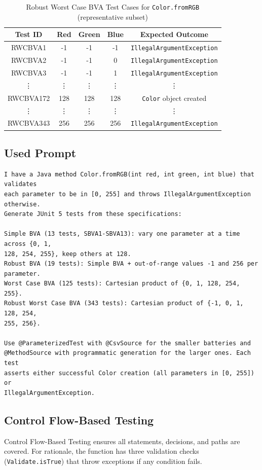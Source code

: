 \documentclass[11pt, a4paper]{article}
\begin{document}
\begin{table}[H]
\centering
\caption{Robust Worst Case BVA Test Cases for \texttt{Color.fromRGB} (representative subset)}
\label{tab:color_robust_worst_case_bva}
\begin{tabular}{ccccc}
\toprule
\textbf{Test ID} & \textbf{Red} & \textbf{Green} & \textbf{Blue} & \textbf{Expected Outcome} \\
\midrule
RWCBVA1   & -1  & -1  & -1  & \texttt{IllegalArgumentException} \\
RWCBVA2   & -1  & -1  & 0   & \texttt{IllegalArgumentException} \\
RWCBVA3   & -1  & -1  & 1   & \texttt{IllegalArgumentException} \\
\vdots    & \vdots & \vdots & \vdots & \vdots \\
RWCBVA172 & 128 & 128 & 128 & \texttt{Color} object created \\
\vdots    & \vdots & \vdots & \vdots & \vdots \\
RWCBVA343 & 256 & 256 & 256 & \texttt{IllegalArgumentException} \\
\bottomrule
\end{tabular}
\end{table}

\subsection{Used Prompt}
\begin{lstlisting}
I have a Java method Color.fromRGB(int red, int green, int blue) that validates
each parameter to be in [0, 255] and throws IllegalArgumentException otherwise.
Generate JUnit 5 tests from these specifications:

Simple BVA (13 tests, SBVA1-SBVA13): vary one parameter at a time across {0, 1,
128, 254, 255}, keep others at 128. 
Robust BVA (19 tests): Simple BVA + out-of-range values -1 and 256 per
parameter. 
Worst Case BVA (125 tests): Cartesian product of {0, 1, 128, 254, 255}. 
Robust Worst Case BVA (343 tests): Cartesian product of {-1, 0, 1, 128, 254,
255, 256}.

Use @ParameterizedTest with @CsvSource for the smaller batteries and
@MethodSource with programmatic generation for the larger ones. Each test
asserts either successful Color creation (all parameters in [0, 255]) or
IllegalArgumentException.
\end{lstlisting}

\subsection{Control Flow-Based Testing}
Control Flow-Based Testing ensures all statements, decisions, and paths are
covered. For rationale, the function has three validation checks
(\texttt{Validate.isTrue}) that throw exceptions if any condition fails.
\end{document}
